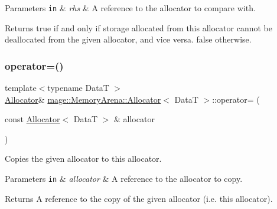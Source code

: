 \begin{DoxyParams}[1]{Parameters}
\mbox{\tt in}  & {\em rhs} & A reference to the allocator to compare with. \\
\hline
\end{DoxyParams}
\begin{DoxyReturn}{Returns}
{\ttfamily true} if and only if storage allocated from this allocator cannot be deallocated from the given allocator, and vice versa. {\ttfamily false} otherwise. 
\end{DoxyReturn}
\hypertarget{classmage_1_1_memory_arena_1_1_allocator_a9774e6cb2e1f8ac94ee9f6a7be4f561a}{}\label{classmage_1_1_memory_arena_1_1_allocator_a9774e6cb2e1f8ac94ee9f6a7be4f561a} 
\subsubsection{\texorpdfstring{operator=()}{operator=()}\hspace{0.1cm}{\footnotesize\ttfamily [1/2]}}
{\footnotesize\ttfamily template$<$typename DataT $>$ \\
\hyperlink{classmage_1_1_memory_arena_1_1_allocator}{Allocator}\& \hyperlink{classmage_1_1_memory_arena_1_1_allocator}{mage\+::\+Memory\+Arena\+::\+Allocator}$<$ DataT $>$\+::operator= (\begin{DoxyParamCaption}\item[{const \hyperlink{classmage_1_1_memory_arena_1_1_allocator}{Allocator}$<$ DataT $>$ \&}]{allocator }\end{DoxyParamCaption})\hspace{0.3cm}{\ttfamily [delete]}}

Copies the given allocator to this allocator.


\begin{DoxyParams}[1]{Parameters}
\mbox{\tt in}  & {\em allocator} & A reference to the allocator to copy. \\
\hline
\end{DoxyParams}
\begin{DoxyReturn}{Returns}
A reference to the copy of the given allocator (i.\+e. this allocator). 
\end{DoxyReturn}
\hypertarget{classmage_1_1_memory_arena_1_1_allocator_a3b57cb5e78f00b8d024a042cbfae679d}{}\label{classmage_1_1_memory_arena_1_1_allocator_a3b57cb5e78f00b8d024a042cbfae679d} 
